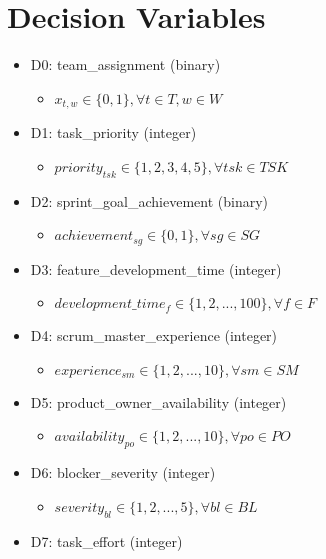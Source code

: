 \documentclass{article}
\begin{document}
\section{Decision Variables}
\begin{itemize}
    \item D0: team\_assignment (binary)
        \begin{itemize}
            \item $x_{t,w} \in \{0,1\}, \forall t \in T, w \in W$
        \end{itemize}
    \item D1: task\_priority (integer)
        \begin{itemize}
            \item $priority_{tsk} \in \{1,2,3,4,5\}, \forall tsk \in TSK$
        \end{itemize}
    \item D2: sprint\_goal\_achievement (binary)
        \begin{itemize}
            \item $achievement_{sg} \in \{0,1\}, \forall sg \in SG$
        \end{itemize}
    \item D3: feature\_development\_time (integer)
        \begin{itemize}
            \item $development\_time_f \in \{1,2,...,100\}, \forall f \in F$
        \end{itemize}
    \item D4: scrum\_master\_experience (integer)
        \begin{itemize}
            \item $experience_{sm} \in \{1,2,...,10\}, \forall sm \in SM$
        \end{itemize}
    \item D5: product\_owner\_availability (integer)
        \begin{itemize}
            \item $availability_{po} \in \{1,2,...,10\}, \forall po \in PO$
        \end{itemize}
    \item D6: blocker\_severity (integer)
        \begin{itemize}
            \item $severity_{bl} \in \{1,2,...,5\}, \forall bl \in BL$
        \end{itemize}
    \item D7: task\_effort (integer)
        \begin{itemize}

\end{itemize}
\end{itemize}
\end{document}
